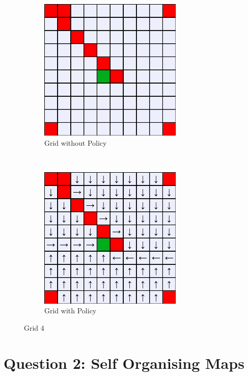 \documentclass[a4paper, 11pt]{article}
\begin{document}
\begin{figure}[h!]
    \centering
    \begin{subfigure}[t]{0.5\textwidth}
        \centering
        \includegraphics[width=0.75\textwidth]{Images_Q1/grid4_default.png}
        \caption{Grid without Policy}
    \end{subfigure}%
    ~ 
    \begin{subfigure}[t]{0.5\textwidth}
        \centering
        \includegraphics[width=0.75\textwidth]{Images_Q1/grid4.png}
        \caption{Grid with Policy}
    \end{subfigure}
    \caption{Grid 4}
    \label{fig:grid4}
\end{figure}
\newpage
\section{Question 2: Self Organising Maps}
\end{document}
